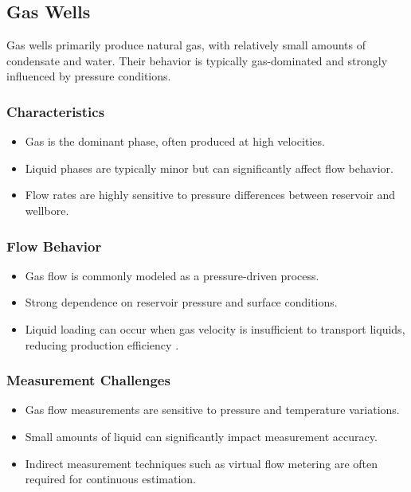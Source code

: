 \documentclass[12pt,APA]{uomthesis}
\begin{document}
\subsection{Gas Wells}
Gas wells primarily produce natural gas, with relatively small amounts of condensate and water. Their behavior is typically gas-dominated and strongly influenced by pressure conditions.

\subsubsection{Characteristics}
\begin{itemize}
\item Gas is the dominant phase, often produced at high velocities.
\item Liquid phases are typically minor but can significantly affect flow behavior.
\item Flow rates are highly sensitive to pressure differences between reservoir and wellbore.
\end{itemize}

\subsubsection{Flow Behavior}
\begin{itemize}
\item Gas flow is commonly modeled as a pressure-driven process.
\item Strong dependence on reservoir pressure and surface conditions.
\item Liquid loading can occur when gas velocity is insufficient to transport liquids, reducing production efficiency \citep{brill1999multiphase}.
\end{itemize}

\subsubsection{Measurement Challenges}
\begin{itemize}
\item Gas flow measurements are sensitive to pressure and temperature variations.
\item Small amounts of liquid can significantly impact measurement accuracy.
\item Indirect measurement techniques such as virtual flow metering are often required for continuous estimation.
\end{itemize}
\end{document}
